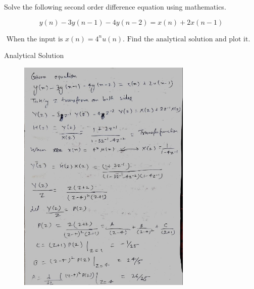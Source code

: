 \documentclass[12pt, letterpaper]{article}
\begin{document}
\begin{section}{Solve the following second order difference equation using mathematics.}

$$y(n)-3 y(n-1)-4 y(n-2)=x(n)+2 x(n-1)$$


$\text { When the input is } x(n)=4^{n} u(n) \text {. Find the analytical solution and plot it. }$

\begin{subsection}{Analytical Solution}
\begin{figure}[!htp]
\begin{center}

\includegraphics[width=0.74\textwidth]{fig1.jpg}


\end{center}
\end{figure}
\end{subsection}
\end{section}
\end{document}
